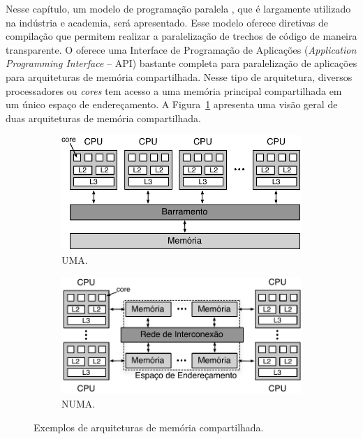 \documentclass{SBCbookchapter}
\begin{document}
	Nesse capítulo, um modelo de programação paralela \openmp, que é
	largamente utilizado na indústria e academia, será apresentado. Esse
	modelo oferece diretivas de compilação que permitem realizar a
	paralelização de trechos de código de maneira transparente. O
	\openmp oferece uma Interface de Programação de Aplicações
	(\textit{Application Programming Interface} -- API) bastante
	completa para paralelização de aplicações para arquiteturas de
	memória compartilhada. Nesse tipo de arquitetura, diversos
	processadores ou \textit{cores} tem acesso a uma memória principal
	compartilhada em um único espaço de endereçamento.  A
	Figura~\ref{fig:uma-numa} apresenta uma visão geral de duas
	arquiteturas de memória compartilhada.

			\begin{figure}[t]
				\captionsetup[subfigure]{justification=centering}
				\centering
					\begin{subfigure}{0.45\linewidth}
						\includegraphics[width=\linewidth]{img/uma}
						\caption{UMA.}
					\end{subfigure}
					\quad\quad
					\begin{subfigure}{0.45\linewidth}
						\includegraphics[width=\linewidth]{img/numa}
						\caption{NUMA.}
					\end{subfigure}
				\caption{Exemplos de arquiteturas de memória compartilhada.}
				\label{fig:uma-numa}
			\end{figure}
\end{document}
